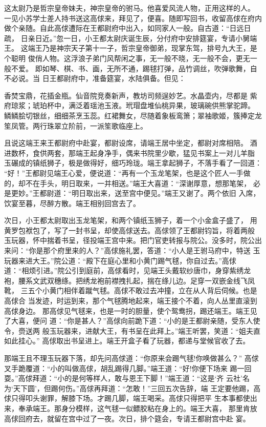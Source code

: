 这太尉乃是哲宗皇帝妹夫，神宗皇帝的驸马。他喜爱风流人物，正用这样的人。
一见小苏学士差人持书送这高俅来，拜见了，便喜。随即写回书，收留高俅在府内
做个亲随。自此高俅遭际在王都尉府中出入，如同家人一般。自古道：“日远日疏，
日亲日近。”忽一日，小王都太尉庆诞生辰，分付府中安排筵宴，专请小舅端王。
这端王乃是神宗天子第十一子，哲宗皇帝御弟，现掌东驾，排号九大王，是个聪明
俊俏人物。这浮浪子弟门风帮闲之事，无一般不晓，无一般不会，更无一般不爱。
即如琴、棋、书、画，无所不通，踢毬打弹，品竹调丝，吹弹歌舞，自不必说。当
日王都尉府中，准备筵宴，水陆俱备。但见：

香焚宝鼎，花插金瓶。仙音院竞奏新声，教坊司频逞妙艺。水晶壶内，尽都是
紫府琼浆；琥珀杯中，满泛着瑶池玉液。玳瑁盘堆仙桃异果，玻璃碗供熊掌驼蹄。
鳞鳞脍切银丝，细细茶烹玉蕊。红裙舞女，尽随着象板鸾箫；翠袖歌姬，簇捧定龙
笙凤管。两行珠翠立阶前，一派笙歌临座上。

且说这端王来王都尉府中赴宴，都尉设席，请端王居中坐定，都尉对席相陪。
酒进数杯，食供两套，那端王起身净手，偶来书院里少歇，猛见书案上一对儿羊脂
玉碾成的镇纸狮子，极是做得好，细巧玲珑。端王拿起狮子，不落手看了一回道：
“好！”王都尉见端王心爱，便说道：“再有一个玉龙笔架，也是这个匠人一手做
的，却不在手头，明日取来，一并相送。”端王大喜道：“深谢厚意，想那笔架，
必是更妙。”王都尉道：“明日取出来，送至宫中便见。”端王又谢了。两个依旧
入席，饮宴至暮，尽醉方散。端王相别回宫去了。

次日，小王都太尉取出玉龙笔架，和两个镇纸玉狮子，着一个小金盒子盛了，
用黄罗包袱包了，写了一封书呈，却使高俅送去。高俅领了王都尉钧旨，将着两般
玉玩器，怀中揣着书呈，径投端王宫中来。把门官吏转报与院公。没多时，院公出
来问：“你是那个府里来的人？”高俅施礼罢，答道：“小人是王驸马府中，特送
玉玩器来进大王。”院公道：“殿下在庭心里和小黄门踢气毬，你自过去。”高俅
道：“相烦引进。”院公引到庭前，高俅看时，见端王头戴软纱唐巾，身穿紫绣龙
袍，腰系文武双穗绦。把绣龙袍前襟拽扎起，揣在绦儿边。足穿一双嵌金线飞凤靴，
三五个小黄门相伴着蹴气毬。高俅不敢过去冲撞，立在从人背后伺候。也是高俅合
当发迹，时运到来，那个气毬腾地起来，端王接个不着，向人丛里直滚到高俅身边。
那高俅见气毬来，也是一时的胆量，使个鸳鸯拐，踢还端王。端王见了大喜，便问
道：“你是甚人？”高俅向前跪下道：“小的是王都尉亲随，受东人使令，赍送两
般玉玩器来，进献大王，有书呈在此拜上。”端王听罢，笑道：“姐夫直如此挂心。”
高俅取出书呈进上。端王开盒子看了玩器，都递与堂候官收了去。

那端王且不理玉玩器下落，却先问高俅道：“你原来会踢气毬!你唤做甚么？”
高俅叉手跪覆道：“小的叫做高俅，胡乱踢得几脚。”端王道：“好!你便下场来
踢一回耍。”高俅拜道：“小的是何等样人，敢与恩王下脚！”端王道：“这是‘齐
云社’名为‘天下圆’，但踢何伤。”高俅再拜道：“怎敢！”三回五次告辞，端
王定要他踢，高俅只得叩头谢罪，解膝下场。才踢几脚，端王喝采。高俅只得把平
生本事都使出来，奉承端王。那身分模样，这气毬一似鳔胶粘在身上的。端王大喜，
那里肯放高俅回府去，就留在宫中过了一夜。次日，排个筵会，专请王都尉宫中赴
宴。

